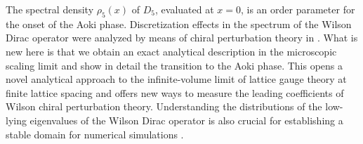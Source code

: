 \documentclass[aps,prl,twocolumn,superscriptaddress,preprintnumbers,floatfix,nofootinbib]{revtex4}
\begin{document}
The spectral density $\rho_5(x)$ of $D_5$, evaluated at 
$x=0$, is an order parameter 
\cite{Heller} for the onset of the Aoki phase. 
Discretization effects in the spectrum of the Wilson Dirac operator were
analyzed by means of chiral perturbation theory in \cite{Sharpe}.
What is new here is that we obtain an exact analytical description 
in the microscopic scaling limit and show in detail the transition to
the Aoki phase. 
This opens a novel analytical approach to the
infinite-volume limit of lattice gauge theory at finite lattice spacing
and offers new ways to measure the leading coefficients of 
Wilson chiral perturbation theory. Understanding the distributions
of the low-lying
eigenvalues of the Wilson Dirac operator is also crucial for
establishing a stable domain for numerical
simulations \cite{Luscher}. 
\end{document}
